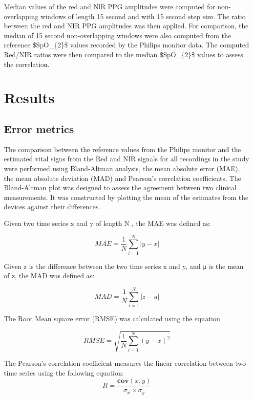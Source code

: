 Median values of the red and NlR PPG amplitudes were computed for non-overlapping windows of length 15 second and with 15 second step size. The ratio between the red and NIR PPG amplitudes was then applied.
For comparison, the median of 15 second non-overlapping windows were also computed from the reference \gls{$SpO_{2}$} values recorded by the Philips monitor data. The computed Red/NIR ratios were then compared to the median \gls{$SpO_{2}$} values to assess the correlation. 

 \section{Results}
 
 \subsection{Error metrics}
 
The comparison between the reference values from the Philips monitor and the estimated vital signs from the Red and NIR signals for all recordings in the study were performed using Bland-Altman analysis, the mean absolute error (MAE), the mean absolute deviation (MAD) and Pearson's correlation coefficients. The Bland-Altman plot was designed to assess the agreement between two clinical \linebreak measurements. It was constructed by plotting the mean of the estimates  from the devices against their differences. 

Given two time series x and y of length N , the MAE was defined as:

\begin{equation}
MAE = \frac{1}{N}\sum_{i=1}^{N} |y-x|
\end{equation}

Given z is the difference between the two time series x and y, and μ is the mean of z, the MAD was defined as:

\begin{equation}
MAD = \frac{1}{N}\sum_{i=1}^{N} |z-u|
\end{equation}

The Root Mean square error (RMSE) was calculated using the equation

\begin{equation}
RMSE = \sqrt{\frac{1}{N}\sum_{i=1}^{N} (y-x)^{2}}
\end{equation}

The Pearson's correlation coefficient measures the linear correlation between two time series using the following equation:
\begin{equation}
R = \frac{\mathbf{cov}(x, y)}{\sigma_{x} \times \sigma_{y}}
\end{equation}

